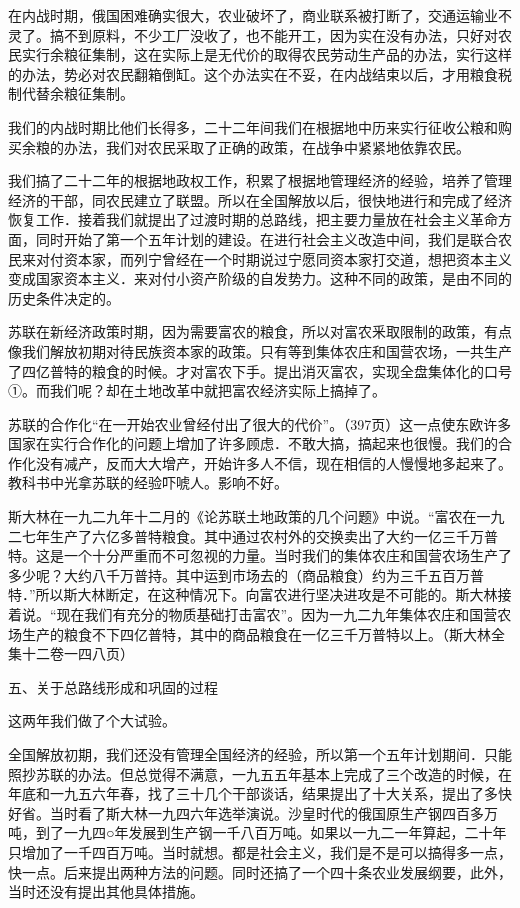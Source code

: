 在内战时期，俄国困难确实很大，农业破坏了，商业联系被打断了，交通运输业不灵了。搞不到原料，不少工厂没收了，也不能开工，因为实在没有办法，只好对农民实行余粮征集制，这在实际上是无代价的取得农民劳动生产品的办法，实行这样的办法，势必对农民翻箱倒缸。这个办法实在不妥，在内战结束以后，才用粮食税制代替余粮征集制。

我们的内战时期比他们长得多，二十二年间我们在根据地中历来实行征收公粮和购买余粮的办法，我们对农民采取了正确的政策，在战争中紧紧地依靠农民。

我们搞了二十二年的根据地政权工作，积累了根据地管理经济的经验，培养了管理经济的干部，同农民建立了联盟。所以在全国解放以后，很快地进行和完成了经济恢复工作．接着我们就提出了过渡时期的总路线，把主要力量放在社会主义革命方面，同时开始了第一个五年计划的建设。在进行社会主义改造中间，我们是联合农民来对付资本家，而列宁曾经在一个时期说过宁愿同资本家打交道，想把资本主义变成国家资本主义．来对付小资产阶级的自发势力。这种不同的政策，是由不同的历史条件决定的。

苏联在新经济政策时期，因为需要富农的粮食，所以对富农釆取限制的政策，有点像我们解放初期对待民族资本家的政策。只有等到集体农庄和国营农场，一共生产了四亿普特的粮食的时候。才对富农下手。提出消灭富农，实现全盘集体化的口号①。而我们呢？却在土地改革中就把富农经济实际上搞掉了。

苏联的合作化“在一开始农业曾经付出了很大的代价”。（397页）这一点使东欧许多国家在实行合作化的问题上增加了许多顾虑．不敢大搞，搞起来也很慢。我们的合作化没有减产，反而大大增产，开始许多人不信，现在相信的人慢慢地多起来了。教科书中光拿苏联的经验吓唬人。影响不好。

斯大林在一九二九年十二月的《论苏联土地政策的几个问题》中说。“富农在一九二七年生产了六亿多普特粮食。其中通过农村外的交换卖出了大约一亿三千万普特。这是一个十分严重而不可忽视的力量。当时我们的集体农庄和国营农场生产了多少呢？大约八千万普持。其中运到市场去的（商品粮食）约为三千五百万普特．”所以斯大林断定，在这种情况下。向富农进行坚决进攻是不可能的。斯大林接着说。“现在我们有充分的物质基础打击富农”。因为一九二九年集体农庄和国营农场生产的粮食不下四亿普特，其中的商品粮食在一亿三千万普特以上。（斯大林全集十二卷一四八页）

五、关于总路线形成和巩固的过程

这两年我们做了个大试验。

全国解放初期，我们还没有管理全国经济的经验，所以第一个五年计划期间．只能照抄苏联的办法。但总觉得不满意，一九五五年基本上完成了三个改造的时候，在年底和一九五六年春，找了三十几个干部谈话，结果提出了十大关系，提出了多快好省。当时看了斯大林一九四六年选举演说。沙皇时代的俄国原生产钢四百多万吨，到了一九四○年发展到生产钢一千八百万吨。如果以一九二一年算起，二十年只增加了一千四百万吨。当时就想。都是社会主义，我们是不是可以搞得多一点，快一点。后来提出两种方法的问题。同时还搞了一个四十条农业发展纲要，此外，当时还没有提出其他具体措施。

